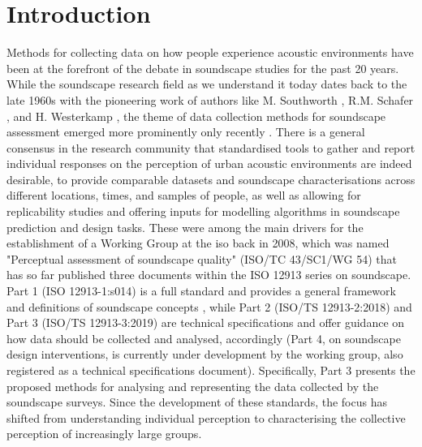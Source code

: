 \section{Introduction}
Methods for collecting data on how people experience acoustic environments have been at the forefront of the debate in soundscape studies for the past 20 years. While the soundscape research field as we understand it today dates back to the late 1960s with the pioneering work of authors like M. Southworth \citep{Southworth1969sonic}, R.M. Schafer \citep{SoundscapeOursonicSchafer}, and H. Westerkamp \citep{Westerkamp2002Linking}, the theme of data collection methods for soundscape assessment emerged more prominently only recently \citep{Kang2016Ten}. There is a general consensus in the research community that standardised tools to gather and report individual responses on the perception of urban acoustic environments are indeed desirable, to provide comparable datasets and soundscape characterisations across different locations, times, and samples of people, as well as allowing for replicability studies and offering inputs for modelling algorithms in soundscape prediction and design tasks. These were among the main drivers for the establishment of a Working Group at the \gls{iso} back in 2008, which was named "Perceptual assessment of soundscape quality" (ISO/TC 43/SC1/WG 54) that has so far published three documents within the ISO 12913 series on soundscape. Part 1 (ISO 12913-1:s014) is a full standard and provides a general framework and definitions of soundscape concepts \citep{ISO12913Part1}, while Part 2 (ISO/TS 12913-2:2018) and Part 3 (ISO/TS 12913-3:2019) are technical specifications and offer guidance on how data should be collected and analysed, accordingly \citep{ISO12913Part2,ISO12913Part3} (Part 4, on soundscape design interventions, is currently under development by the working group, also registered as a technical specifications document). Specifically, Part 3 presents the proposed methods for analysing and representing the data collected by the soundscape surveys. Since the development of these standards, the focus has shifted from understanding individual perception to characterising the collective perception of increasingly large groups.


